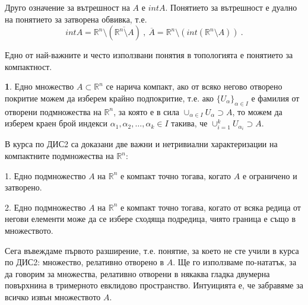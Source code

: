 \documentclass[11pt]{article}
\numberwithin{equation}{section}
\numberwithin{figure}{section}
\numberwithin{table}{section}
\theoremstyle{plain}
\theoremstyle{definition}
\newtheorem{defn}[thm]{\protect\definitionname}
\theoremstyle{remark}
\theoremstyle{definition}
\theoremstyle{remark}
\theoremstyle{plain}
\theoremstyle{definition}
\theoremstyle{definition}
\theoremstyle{plain}
\theoremstyle{plain}
\theoremstyle{plain}
\theoremstyle{definition}
\theoremstyle{plain}
\providecommand{\definitionname}{Дефиниция}
\newcommand*{\R}{\mathbb{R}}
\begin{document}
Друго означение за вътрешност на $A$ е $int A$. Понятието за вътрешност е дуално на понятието за затворена обвивка, т.е.
$$int{A} = \R^n \setminus \left(\overline{\R^n\setminus A}\right) \ , \ \overline{A}=
\R^n \setminus \left(int{(\R^n\setminus A)}\right) \ .$$

Едно от най-важните и често използвани понятия в топологията е понятието за компактност.
\begin{defn}
Едно множество $A\subset \R^n$ се нарича компакт, ако от всяко негово отворено покритие можем да изберем крайно подпокритие, т.е. ако $\{U_\alpha\}_{\alpha \in I}$ е фамилия от отворени подмножества на $\R^n$, за която е в сила $\cup_{\alpha\in I} U_\alpha \supset A$, то можем да изберем краен брой индекси $\alpha_1, \alpha_2, \dots , \alpha_k \in I$ такива, че $\cup_{i=1}^k U_{\alpha_i} \supset A$.
\end{defn}

В курса по ДИС2 са доказани две важни и нетривиални характеризации на компактните подмножества на $\R^n$:

1. Едно подмножество $A$ на $\R^n$ е компакт точно тогава, когато $A$ е ограничено и затворено.

2. Едно подмножество $A$ на $\R^n$ е компакт точно тогава, когато от всяка редица от негови елементи може да се избере сходяща подредица, чиято граница е също в множеството.

\bigskip

Сега въвеждаме първото разширение, т.е. понятие, за което не сте учили в курса по ДИС2: множество, релативно отворено в $A$. Ще го използваме по-нататък, за да говорим за множества, релативно отворени в някаква гладка двумерна повърхнина в тримерното евклидово пространство. Интуицията е, че забравяме за всичко извън множеството $A$.
\end{document}
